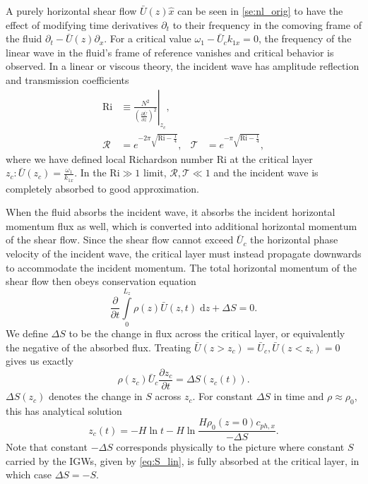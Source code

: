 \documentclass[
        fleqn,
        usenatbib,
    ]{mnras}
\newcommand*{\pd}[2]{\frac{\partial#1}{\partial#2}}
\newcommand*{\at}[1]{\left.#1\right|}
\newcommand*{\p}[1]{\left(#1\right)}
\begin{document}
A purely horizontal shear flow $\bar{U}(z) \hat{x}$ can be seen in
\autoref{se:nl_orig} to have the effect of modifying time derivatives
$\partial_t$ to their frequency in the comoving frame of the fluid $\partial_t -
\bar{U}(z)\partial_x$. For a critical value $\omega_1 - \bar{U}_c k_{1x} = 0$,
the frequency of the linear wave in the fluid's frame of reference vanishes and
critical behavior is observed. In a linear \citep{booker_bretherton} or viscous
\citep{hazel} theory, the incident wave has amplitude reflection and
transmission coefficients
\begin{align}
    \mathrm{Ri} &\equiv \at{\frac{N^2}{\p{\pd{\bar{U}}{z}}^2}}_{z_c},
        \label{eq:ri_def}\\
    \mathcal{R} &= e^{-2\pi \sqrt{\mathrm{Ri} - \frac{1}{4}}}, &
    \mathcal{T} &= e^{-\pi \sqrt{\mathrm{Ri} - \frac{1}{4}}},
        \label{eq:crit_coeffs}
\end{align}
where we have defined local Richardson number Ri at the critical layer $z_c:
\bar{U}(z_c) = \frac{\omega_1}{k_{1x}}$. In the $\mathrm{Ri} \gg 1$ limit,
$\mathcal{R}, \mathcal{T} \ll 1$ and the incident wave is completely absorbed to
good approximation.

When the fluid absorbs the incident wave, it absorbs the incident horizontal
momentum flux as well, which is converted into additional horizontal momentum of
the shear flow. Since the shear flow cannot exceed $\bar{U}_c$ the horizontal
phase velocity of the incident wave, the critical layer must instead propagate
downwards to accommodate the incident momentum. The total horizontal momentum of
the shear flow then obeys conservation equation
\begin{equation}
    \pd{}{t}\int\limits_0^{L_z} \rho(z) \bar{U}(z, t)\;\mathrm{d}z
        + \Delta S = 0.
\end{equation}
We define $\Delta S$ to be the change in flux across the critical layer, or
equivalently the negative of the absorbed flux. Treating $\bar{U}(z > z_c) =
\bar{U}_c, \bar{U}(z < z_c) = 0$ gives us exactly
\begin{equation}
    \rho(z_c) \bar{U}_c\pd{z_c}{t} = \Delta S(z_c(t)).\label{eq:zc_anal}
\end{equation}
$\Delta S(z_c)$ denotes the change in $S$ across $z_c$. For constant $\Delta S$
in time and $\rho \approx \rho_0$, this has analytical solution
\begin{equation}
    z_c(t) = -H\ln t - H\ln \frac{H\rho_0(z = 0)c_{ph, x}}{-\Delta S}
        .\label{eq:zc_sol}
\end{equation}
Note that constant $-\Delta S$ corresponds physically to the picture where
constant $S$ carried by the IGWs, given by \autoref{eq:S_lin}, is fully absorbed
at the critical layer, in which case $\Delta S = -S$.
\end{document}
